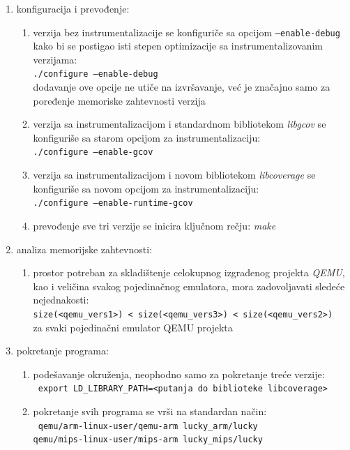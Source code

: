 \documentclass[12pt,oneside]{memoir}
\newcommand{\kod}[1]{\texttt{#1}}
\newcommand{\strano}[1]{\textit{#1}}
\begin{document}
\begin{enumerate}

\item konfiguracija i prevođenje:
\begin{enumerate}
\item verzija bez instrumentalizacije se konfiguriče sa opcijom \kod{–enable-debug} kako bi se postigao isti stepen optimizacije sa instrumentalizovanim verzijama: \\ \kod{./configure –enable-debug}\\ dodavanje ove opcije ne utiče na izvršavanje, već je značajno samo za poređenje memoriske zahtevnosti verzija
\item verzija sa instrumentalizacijom i standardnom bibliotekom \strano{libgcov} se konfiguriše sa starom opcijom za instrumentalizaciju: \\
\kod{./configure –enable-gcov}
\item verzija sa instrumentalizacijom i novom bibliotekom \strano{libcoverage} se konfiguriše sa novom opcijom za instrumentalizaciju: \\
\kod{./configure –enable-runtime-gcov}
\item prevođenje sve tri verzije se inicira ključnom rečju: \strano{make}
\end{enumerate}

\item analiza memorijske zahtevnosti:
\begin{enumerate}
\item prostor potreban za skladištenje celokupnog izgrađenog projekta \strano{QEMU}, kao i veličina svakog pojedinačnog emulatora, mora zadovoljavati sledeće nejednakosti: \\
\kod{size(<qemu\_vers1>) < size(<qemu\_vers3>) < size(<qemu\_vers2>)} \\
za svaki pojedinačni emulator QEMU projekta
\end{enumerate}

\item pokretanje programa:
\begin{enumerate}
\item podešavanje okruženja, neophodno samo za pokretanje treće verzije: \\
\kod{ export LD\_LIBRARY\_PATH=<putanja do biblioteke libcoverage>}
\item pokretanje svih programa se vrši na standardan način: \\
\kod{ qemu/arm-linux-user/qemu-arm lucky\_arm/lucky} \\
\kod{qemu/mips-linux-user/mips-arm lucky\_mips/lucky}
\end{enumerate}


\end{enumerate}
\end{document}
